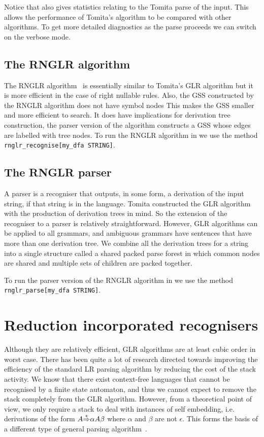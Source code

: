 Notice that \gtb also gives statistics relating to the Tomita parse of
the input. This allows the performance of Tomita's
algorithm to be compared with other algorithms.
To get more detailed diagnostics as the parse proceeds we can switch
on the verbose mode.



\subsection{The RNGLR algorithm}

The RNGLR algorithm~\cite{ESAJ04A} 
is essentially similar to Tomita's GLR algorithm but
it is more efficient in the case of right nullable rules. Also,
the GSS constructed by the RNGLR algorithm does not have symbol nodes
This makes the GSS smaller and more efficient to search. It does have
implications for derivation tree construction, the parser version of
the algorithm constructs a GSS whose edges are labelled with tree
nodes. 
To run the RNGLR algorithm in \gtb we use the method
\verb+rnglr_recognise[my_dfa STRING]+.

\subsection{The RNGLR parser}

A parser is a recogniser that outputs, in some form, a
derivation of the input string, if that string is in the language.
Tomita constructed the GLR algorithm with the production of derivation
trees in mind. So the extension of the recogniser to a parser is
relatively straightforward. However, GLR algorithms can be applied to
all grammars, and ambiguous grammars have sentences that have more
than one derivation tree. 
We combine all the derivation trees for a string into a single structure
called a shared packed parse forest in which common nodes are
shared and multiple sets of children are packed together.

To run the parser version of the RNGLR algorithm in \gtb we use the
method
\verb+rnglr_parse[my_dfa STRING]+.


\section{Reduction incorporated recognisers}\label{RIGLR}

Although they are relatively efficient, GLR algorithms are at least
cubic order in worst case. There has been quite a lot of research
directed towards improving the efficiency of the standard LR parsing
algorithm by reducing the cost of the stack activity.
We know that there exist context-free languages that cannot be
recognised by a finite state automaton, and thus we cannot expect to
remove the stack completely from the GLR algorithm. However, from
a theoretical point of view, we only require a stack to deal with
instances of self embedding, i.e. derivations of the form
$A{\mathop{\Rightarrow}\limits^*}\alpha A\beta$ where $\alpha$ and $\beta$ are not $\epsilon$.
This forms the basis of a different type of general
parsing algorithm~\cite{AH99}. 

